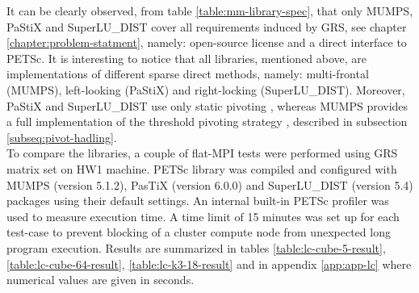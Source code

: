 It can be clearly observed, from table \ref{table:mm-library-spec}, that only MUMPS, PaStiX and SuperLU\_DIST cover all requirements induced by GRS, see chapter \ref{chapter:problem-statment}, namely: open-source license and a direct interface to PETSc. It is interesting to notice that all libraries, mentioned above, are implementations of different sparse direct methods, namely: multi-frontal (MUMPS), left-looking (PaStiX) and right-locking (SuperLU\_DIST). Moreover, PaStiX and SuperLU\_DIST use only static pivoting \cite{pastix-manual}, \cite{superlu-manual} whereas MUMPS provides a full implementation of the threshold pivoting strategy \cite{mumps-manual}, described in subsection \ref{subseq:pivot-hadling}.\\


To compare the libraries, a couple of flat-MPI tests were performed using GRS matrix set on HW1 machine. PETSc library was compiled and configured with MUMPS (version 5.1.2), PasTiX (version 6.0.0) and SuperLU\_DIST (version 5.4) packages using their default settings. An internal built-in PETSc profiler was used to measure execution time.  A time limit of 15 minutes was set up for each test-case to prevent blocking of a cluster compute node from unexpected long program execution. Results are summarized in tables \ref{table:lc-cube-5-result}, \ref{table:lc-cube-64-result}, \ref{table:lc-k3-18-result} and in appendix \ref{app:app-lc} where numerical values are given in seconds.\\



